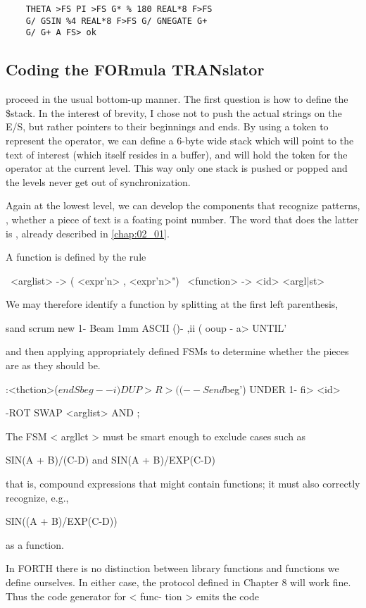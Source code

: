 \begin{lstlisting}
    THETA >FS PI >FS G* % 180 REAL*8 F>FS
    G/ GSIN %4 REAL*8 F>FS G/ GNEGATE G+
    G/ G+ A FS> ok
\end{lstlisting}

\subsection{Coding the FORmula TRANslator}
 proceed in the usual bottom-up manner. The first question is how to define the \$stack. In the interest of brevity, I chose not to push the actual strings on the E/S, but rather pointers to their beginnings and ends. By using a token to represent the operator, we can define a 6-byte wide stack which will point to the text of interest (which itself resides in a buffer), and will hold the token for the operator at the current level. This way only one stack is pushed or popped and the levels never get out of synchronization.

Again at the lowest level, we can develop the components that recognize patterns, \eg, whether a piece of text is a foating point number. The word that does the latter is , already described in \ref{chap:02_01}.

A function is defined by the rule

\ <arglist> -> ( <expr'n> {, <expr'n>}")
\ <function> -> <id> <argl|st>

We may therefore identify a function by splitting at the first left
parenthesis,

sand scrum new
1- Beam 1mm ASCII ()- ,ii (
ooup - a> UNTIL'

and then applying appropriately defined FSMs to determine
whether the pieces are as they should be.

:<thction>($endSbeg--i)
DUP>R >( (--Send$beg')
UNDER 1- fi> <id>

-ROT SWAP <arglist> AND ;

The FSM < argllct > must be smart enough to exclude cases such
as

SIN(A + B)/(C-D)
and
SIN(A + B)/EXP(C-D)

that is, compound expressions that might contain functions; it
must also correctly recognize, e.g.,

SIN((A + B)/EXP(C-D))

as a function.

In FORTH there is no distinction between library functions and
functions we define ourselves. In either case, the protocol defined
in Chapter 8 will work fine. Thus the code generator for < func-
tion > emits the code

